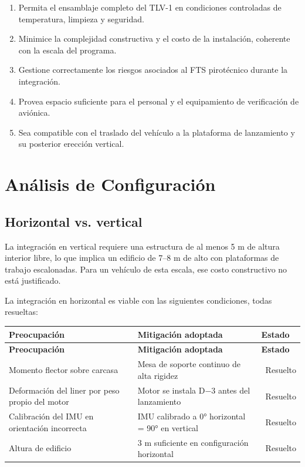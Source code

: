 \documentclass[11pt, a4paper]{article}
\newcommand{\cmark}{\textcolor{tlvgreen}{\textbf{\checkmark}}}
\begin{document}
\begin{enumerate}[leftmargin=1.5cm, itemsep=3pt]
  \item Permita el ensamblaje completo del TLV-1 en condiciones controladas de temperatura, limpieza y seguridad.
  \item Minimice la complejidad constructiva y el costo de la instalación, coherente con la escala del programa.
  \item Gestione correctamente los riesgos asociados al FTS pirotécnico durante la integración.
  \item Provea espacio suficiente para el personal y el equipamiento de verificación de aviónica.
  \item Sea compatible con el traslado del vehículo a la plataforma de lanzamiento y su posterior erección vertical.
\end{enumerate}

\section{An\'{a}lisis de Configuraci\'{o}n}

\subsection{Horizontal vs. vertical}

La integración en vertical requiere una estructura de al menos 5 m de altura interior libre, lo que implica un edificio de 7--8 m de alto con plataformas de trabajo escalonadas. Para un vehículo de esta escala, ese costo constructivo no está justificado.

La integración en horizontal es viable con las siguientes condiciones, todas resueltas:

\begin{longtable}{L{5cm} L{4.5cm} L{4cm}}
  \color{white}\textbf{Preocupación} &
  \color{white}\textbf{Mitigación adoptada} &
  \color{white}\textbf{Estado} \\
  \endfirsthead
  \color{white}\textbf{Preocupación} &
  \color{white}\textbf{Mitigación adoptada} &
  \color{white}\textbf{Estado} \\
  \endhead
  Momento flector sobre carcasa & Mesa de soporte continuo de alta rigidez & \cmark\ Resuelto \\
  Deformación del liner por peso propio del motor & Motor se instala D$-$3 antes del lanzamiento & \cmark\ Resuelto \\
  Calibración del IMU en orientación incorrecta & IMU calibrado a 0° horizontal = 90° en vertical & \cmark\ Resuelto \\
  Altura de edificio & 3 m suficiente en configuración horizontal & \cmark\ Resuelto \\
\end{longtable}
\end{document}
